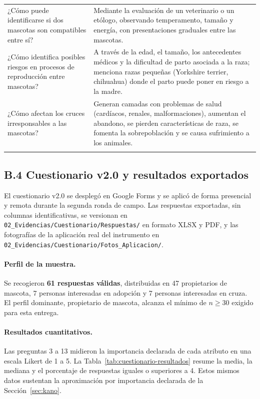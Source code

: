 \documentclass[journal,onecolumn]{IEEEtran}
\begin{document}
{\begin{longtable}{@{}p{5.6cm} p{9.4cm}@{}}
			¿Cómo puede identificarse si dos mascotas son compatibles entre sí? & Mediante la evaluación de un veterinario o un etólogo, observando temperamento, tamaño y energía, con presentaciones graduales entre las mascotas. \\ \addlinespace
			
			¿Cómo identifica posibles riesgos en procesos de reproducción entre mascotas? & A través de la edad, el tamaño, los antecedentes médicos y la dificultad de parto asociada a la raza; menciona razas pequeñas (Yorkshire terrier, chihuahua) donde el parto puede poner en riesgo a la madre. \\ \addlinespace
			
			¿Cómo afectan los cruces irresponsables a las mascotas? & Generan camadas con problemas de salud (cardíacos, renales, malformaciones), aumentan el abandono, se pierden características de raza, se fomenta la sobrepoblación y se causa sufrimiento a los animales. \\ \addlinespace
			
		\end{longtable}
	}

	\subsection*{B.4 Cuestionario v2.0 y resultados exportados}
	
	El cuestionario v2.0 se desplegó en Google Forms y se aplicó de forma
	presencial y remota durante la segunda ronda de campo. Las respuestas
	exportadas, sin columnas identificativas, se versionan en
	\texttt{02\_Evidencias/Cuestionario/Respuestas/} en formato XLSX y PDF, y las
	fotografías de la aplicación real del instrumento en
	\texttt{02\_Evidencias/Cuestionario/Fotos\_Aplicacion/}.
	
	\paragraph{Perfil de la muestra.}
	Se recogieron \textbf{61 respuestas válidas}, distribuidas en 47 propietarios
	de mascota, 7 personas interesadas en adopción y 7 personas interesadas en
	cruza. El perfil dominante, propietario de mascota, alcanza el mínimo de
	$n \geq 30$ exigido para esta entrega.
	
	\paragraph{Resultados cuantitativos.}
	Las preguntas 3 a 13 midieron la importancia declarada de cada atributo en
	una escala Likert de 1 a 5. La Tabla~\ref{tab:cuestionario-resultados}
	resume la media, la mediana y el porcentaje de respuestas iguales o
	superiores a 4. Estos mismos datos sustentan la aproximación por importancia
	declarada de la Sección~\ref{sec:kano}.
	
\end{document}
